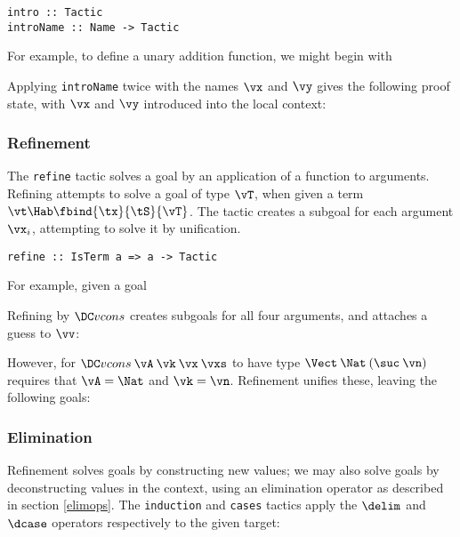 \begin{verbatim}
intro :: Tactic
introName :: Name -> Tactic
\end{verbatim}

For example, to define a unary addition function, we might begin
with


Applying \texttt{introName} twice with the names $\vx$ and $\vy$ gives
the following proof state, with $\vx$ and $\vy$ introduced into the
local context:

\subsubsection{Refinement}
The \texttt{refine} tactic solves a goal by an application of a
function to arguments. Refining attempts to solve a goal of type
$\vT$, when given a term $\vt\Hab\fbind{\tx}{\tS}{\vT}$. The tactic
creates a subgoal for each argument $\vx_i$, attempting to solve it by
unification.

\begin{verbatim}
refine :: IsTerm a => a -> Tactic
\end{verbatim}

For example, given a goal
\DM{
\Axiom{
\hole{\vv}{\Vect\:\Nat\:(\suc\:\vn)}}
}

Refining by $\Vcons$ creates subgoals for all four arguments, and
attaches a guess to $\vv$:
\DM{
\Axiom{
\AR{
\hole{\vA}{\Type}\\
\hole{\vk}{\Nat}\\
\hole{\vx}{\vA}\\
\hole{\vxs}{\Vect\:\vA\:\vk}\\
\guess{\vv}{\Vect\:\Nat\:(\suc\:\vn)}{\Vcons\:\vA\:\vk\:\vx\:\vxs}
}
}
}

However, for $\Vcons\:\vA\:\vk\:\vx\:\vxs$ to have type
$\Vect\:\Nat\:(\suc\:\vn)$ requires that $\vA=\Nat$ and $\vk=\vn$.
Refinement unifies these, leaving the
following goals:
\DM{
\Axiom{
\AR{
\hole{\vx}{\Nat}\\
\hole{\vxs}{\Vect\:\Nat\:\vn}\\
\guess{\vv}{\Vect\:\Nat\:(\suc\:\vn)}{\Vcons\:\Nat\:\vn\:\vx\:\vxs}
}
}
}


\subsubsection{Elimination}
Refinement solves goals by constructing new values; we may also solve
goals by deconstructing values in the context, using an elimination
operator as described in section \ref{elimops}. The \texttt{induction}
and \texttt{cases} tactics apply the $\delim$ and $\dcase$ operators
respectively to the given target:

